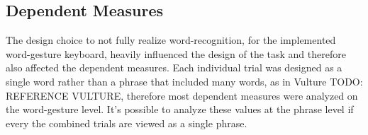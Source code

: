 \begin{table}[h] %
	\centering
	\caption[Pilot Study Schedule of Assessments]{\centering Schedule of Assessments for a single study visit (in minutes).}
	\label{pilot_schedule_of_assessments}
\end{table}
	
\subsection{Dependent Measures} \label{pilot_dependent_measures}
The design choice to not fully realize word-recognition, for the implemented word-gesture keyboard, heavily influenced the design of the task and therefore also affected the dependent measures. Each individual trial was designed as a single word rather than a phrase that included many words, as in Vulture TODO: REFERENCE VULTURE, therefore most dependent measures were analyzed on the word-gesture level. It's possible to analyze these values at the phrase level if every the combined trials are viewed as a single phrase.

